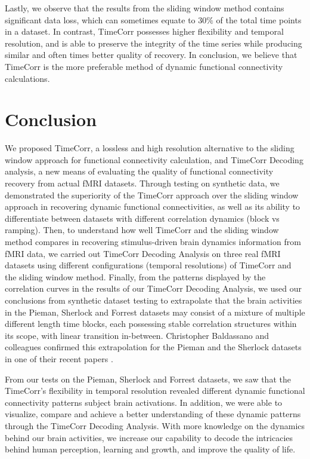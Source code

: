 \documentclass[11pt]{article}
\begin{document}
Lastly, we observe that the results from the sliding window method contains significant data loss, which can sometimes equate to $30\%$ of the total time points in a dataset. In contrast, TimeCorr possesses higher flexibility and temporal resolution, and is able to preserve the integrity of the time series while producing similar and often times better quality of recovery. In conclusion, we believe that TimeCorr is the more preferable method of dynamic functional connectivity calculations.


\clearpage
\newpage
\section{Conclusion}
We proposed TimeCorr, a lossless and high resolution alternative to the sliding window approach for functional connectivity calculation, and TimeCorr Decoding analysis, a new means of evaluating the quality of functional connectivity recovery from actual fMRI datasets. Through testing on synthetic data, we demonstrated the superiority of the TimeCorr approach over the sliding window approach in recovering dynamic functional connectivities, as well as its ability to differentiate between datasets with different correlation dynamics (block vs ramping). Then, to understand how well TimeCorr and the sliding window method compares in recovering stimulus-driven brain dynamics information from fMRI data, we carried out TimeCorr Decoding Analysis on three real fMRI datasets using different configurations (temporal resolutions) of TimeCorr and the sliding window method. Finally, from the patterns displayed by the correlation curves in the results of our TimeCorr Decoding Analysis, we used our conclusions from synthetic dataset testing to extrapolate that the brain activities in the Pieman, Sherlock and Forrest datasets may consist of a mixture of multiple different length time blocks, each possessing stable correlation structures within its scope, with linear transition in-between. Christopher Baldassano and colleagues confirmed this extrapolation for the Pieman and the Sherlock datasets in one of their recent papers \citep{Baldassano2016}.

From our tests on the Pieman, Sherlock and Forrest datasets, we saw that the TimeCorr's flexibility in temporal resolution revealed different dynamic functional connectivity patterns subject brain activations. In addition, we were able to visualize, compare and achieve a better understanding of these dynamic patterns through the TimeCorr Decoding Analysis. With more knowledge on the dynamics behind our brain activities, we increase our capability to decode the intricacies behind human perception, learning and growth, and improve the quality of life.
\end{document}
